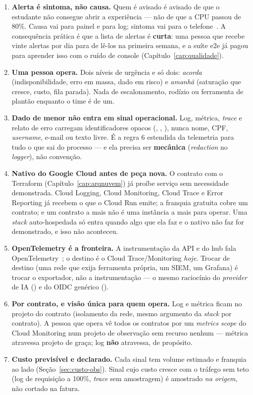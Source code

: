 \begin{enumerate}
  \item \textbf{Alerta é sintoma, não causa.} Quem é avisado é avisado de
    que o estudante não consegue abrir a experiência --- não de que a CPU
    passou de 80\%. Causa vai para painel e para log; sintoma vai para o
    telefone~\cite{beyer2016sre}. A consequência prática é que a lista de
    alertas é \textbf{curta}: uma pessoa que recebe vinte alertas por dia
    para de lê-los na primeira semana, e a suíte e2e já pagou para aprender
    isso com o ruído de console (Capítulo~\ref{cap:qualidade}).
  \item \textbf{Uma pessoa opera.} Dois níveis de urgência e só dois:
    \emph{acorda} (indisponibilidade, erro em massa, dado em risco) e
    \emph{amanhã} (saturação que cresce, custo, fila parada). Nada de
    escalonamento, rodízio ou ferramenta de plantão enquanto o time é de um.
  \item \textbf{Dado de menor não entra em sinal operacional.} Log, métrica,
    \emph{trace} e relato de erro carregam identificadores opacos
    (, , ), nunca nome, CPF,
    \emph{username}, e-mail ou texto livre. É a regra 6 estendida da
    telemetria para tudo o que sai do processo --- e ela precisa ser
    \textbf{mecânica} (\emph{redaction} no \emph{logger}), não convenção.
  \item \textbf{Nativo do Google Cloud antes de peça nova.} O contrato com o
    Terraform (Capítulo~\ref{cap:arqnuvem}) já proíbe serviço sem necessidade
    demonstrada. Cloud Logging, Cloud Monitoring, Cloud Trace e Error
    Reporting já recebem o que o Cloud Run emite; a franquia gratuita cobre
    um contrato; e um contrato a mais não é uma instância a mais para
    operar. Uma \emph{stack} auto-hospedada só entra quando algo que ela faz
    e o nativo não faz for demonstrado, e isso não aconteceu.
  \item \textbf{OpenTelemetry é a fronteira.} A instrumentação da API e do
    hub fala OpenTelemetry~\cite{opentelemetry2026}; o destino é o Cloud
    Trace/Monitoring \emph{hoje}. Trocar de destino (uma rede que exija
    ferramenta própria, um SIEM, um Grafana) é trocar o exportador, não a
    instrumentação --- o mesmo raciocínio do \emph{provider} de IA
    () e do OIDC genérico ().
  \item \textbf{Por contrato, e visão única para quem opera.} Log e métrica
    ficam no projeto do contrato (isolamento da rede, mesmo argumento da
    \emph{stack} por contrato). A pessoa que opera vê todos os contratos por
    um \emph{metrics scope} do Cloud Monitoring num projeto de observação
    sem recurso nenhum --- métrica atravessa projeto de graça; log
    \textbf{não} atravessa, de propósito.
  \item \textbf{Custo previsível e declarado.} Cada sinal tem volume
    estimado e franquia ao lado (Seção~\ref{sec:custo-obs}). Sinal cujo
    custo cresce com o tráfego sem teto (log de requisição a 100\%,
    \emph{trace} sem amostragem) é amostrado \emph{na origem}, não cortado
    na fatura.
\end{enumerate}

